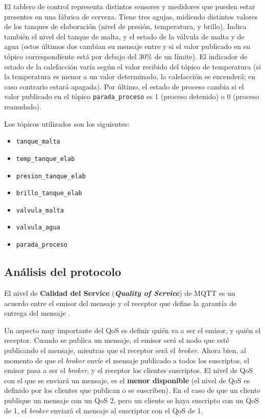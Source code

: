 El tablero de control representa distintos sensores y medidores que pueden estar presentes en una fábrica de cerveza. Tiene tres agujas, midiendo distintos valores de los tanques de elaboración (nivel de presión, temperatura, y brillo). Indica también el nivel del tanque de malta, y el estado de la válvula de malta y de agua (estos últimos dos cambian su mensaje entre  y  si el valor publicado en su tópico correspondiente está por debajo del 30\% de un límite). El indicador de estado de la calefacción varía según el valor recibido del tópico de temperatura (si la temperatura es menor a un valor determinado, la calefacción se encenderá; en caso contrario estará apagada). Por último, el estado de proceso cambia si el valor publicado en el tópico \texttt{parada\_proceso} es 1 (proceso detenido) o 0 (proceso reanudado).

Los tópicos utilizados son los siguientes:

\begin{itemize}
    \item \texttt{tanque\_malta} 
    \item \texttt{temp\_tanque\_elab} 
    \item \texttt{presion\_tanque\_elab} 
    \item \texttt{brillo\_tanque\_elab} 
    \item \texttt{valvula\_malta} 
    \item \texttt{valvula\_agua} 
    \item \texttt{parada\_proceso} 
\end{itemize}

\subsection{Análisis del protocolo}

El nivel de \textbf{Calidad del Service} (\emph{\textbf{Quality of Service}}) de MQTT es un acuerdo entre el emisor del mensaje y el receptor que define la garantía de entrega del mensaje \autocite{HiveMQQoS}. 

Un aspecto muy importante del QoS es definir quién va a ser el emisor, y quién el receptor. Cuando se publica un mensaje, el emisor será el nodo que esté publicando el mensaje, mientras que el receptor será el \emph{broker}. Ahora bien, al momento de que el \emph{broker} envíe el mensaje publicado a todos los suscriptos, el emisor pasa a ser el \emph{broker}, y el receptor los clientes suscriptos.   
El nivel de QoS con el que se enviará un mensaje, es el \textbf{menor disponible} (el nivel de QoS es definido por los clientes que publican o se suscriben). En el caso de que un cliente publique un mensaje con un QoS 2, pero un cliente se haya suscripto con un QoS de 1, el \emph{broker} enviará el mensaje al suscriptor con el QoS de 1.

